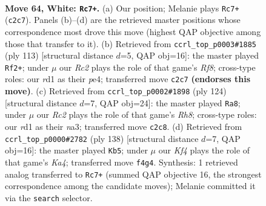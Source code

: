 \documentclass[11pt]{article}
\begin{document}
\clearpage

\begin{figure}[p]\centering
\begin{subfigure}{0.46\textwidth}\centering
\resizebox{\linewidth}{!}{%
\newchessgame
\chessboard[
  setfen={8/6k1/8/pr6/5K2/1P6/2R4P/3r4 w - - 2 64},
  showmover=false,
  pgfstyle=straightmove, color=movearrow, markmove={c2-c7}
]}
\caption{}
\end{subfigure}\hfill
\begin{subfigure}{0.46\textwidth}\centering
\resizebox{\linewidth}{!}{%
\newchessgame
\chessboard[
  setfen={8/4k3/1PR2p2/8/4P1p1/8/K7/5r2 b - - 21 57},
  showmover=false,
  pgfstyle=straightmove, color=movearrow, markmove={f1-f2}
]}
\caption{}
\end{subfigure}
\\[4pt]
\begin{subfigure}{0.46\textwidth}\centering
\resizebox{\linewidth}{!}{%
\newchessgame
\chessboard[
  setfen={7R/5k2/pr6/4K3/1P5P/n5P1/8/8 w - - 1 63},
  showmover=false,
  pgfstyle=straightmove, color=movearrow, markmove={h8-a8}
]}
\caption{}
\end{subfigure}\hfill
\begin{subfigure}{0.46\textwidth}\centering
\resizebox{\linewidth}{!}{%
\newchessgame
\chessboard[
  setfen={8/2k5/6rp/8/K7/4R1P1/8/8 w - - 5 70},
  showmover=false,
  pgfstyle=straightmove, color=movearrow, markmove={a4-b5}
]}
\caption{}
\end{subfigure}
\caption{\textbf{Move 64, White: \texttt{Rc7+}.} (a) Our position; Melanie plays \texttt{Rc7+} (\texttt{c2c7}). Panels (b)--(d) are the retrieved master positions whose correspondence most drove this move (highest QAP objective among those that transfer to it). (b) Retrieved from \texttt{ccrl\_top\_p0003\#1885} (ply 113) [structural distance $d$=5, QAP obj=16]: the master played \texttt{Rf2+}; under $\mu$ our \emph{Rc2} plays the role of that game's \emph{Rf8}; cross-type roles: our \emph{r}d1 as their \emph{p}e4; transferred move \texttt{c2c7} \textbf{(endorses this move)}. (c) Retrieved from \texttt{ccrl\_top\_p0002\#1898} (ply 124) [structural distance $d$=7, QAP obj=24]: the master played \texttt{Ra8}; under $\mu$ our \emph{Rc2} plays the role of that game's \emph{Rh8}; cross-type roles: our \emph{r}d1 as their \emph{n}a3; transferred move \texttt{c2c8}. (d) Retrieved from \texttt{ccrl\_top\_p0000\#2782} (ply 138) [structural distance $d$=7, QAP obj=16]: the master played \texttt{Kb5}; under $\mu$ our \emph{Kf4} plays the role of that game's \emph{Ka4}; transferred move \texttt{f4g4}. Synthesis: 1 retrieved analog transferred to \texttt{Rc7+} (summed QAP objective 16, the strongest correspondence among the candidate moves); Melanie committed it via the \texttt{search} selector.}
\label{fig:thought-m126}
\end{figure}
\end{document}
